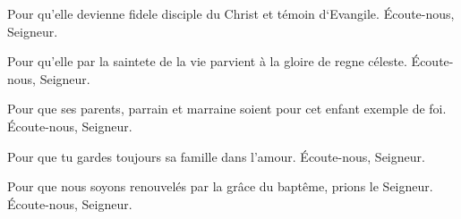  Pour qu'elle devienne fidele disciple du Christ et
témoin d‘Evangile. \Rbardot{} Écoute-nous, Seigneur.

 Pour qu'elle par la saintete de la vie parvient
à la gloire de regne céleste. \Rbardot{} Écoute-nous, Seigneur.

 Pour que ses parents, parrain et marraine soient
pour cet enfant exemple de foi. \Rbardot{} Écoute-nous, Seigneur.

 Pour que tu gardes toujours sa famille dans l’amour. \Rbardot{} Écoute-nous, Seigneur.

 Pour que nous soyons renouvelés par la grâce du
baptême, prions le Seigneur. \Rbardot{} Écoute-nous, Seigneur.
